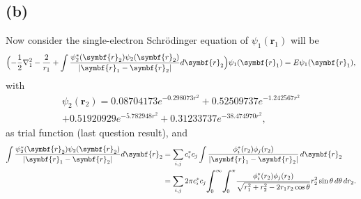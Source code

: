 

\subsection*{(b)}

Now consider the single-electron Schrödinger equation of $\psi_1(\symbf{r}_1)$ will be
%
\begin{equation}
    \Bigl(
    -\frac{1}{2}\nabla_1^2 - \frac{2}{r_1} + \int
    \frac{\psi_2^\ast(\symbf{r}_2)\psi_2(\symbf{r}_2)}{\lvert \symbf{r}_1 - \symbf{r}_2 \rvert} d\symbf{r}_2
    \Bigr)
    \psi_1(\symbf{r}_1) = E \psi_1 (\symbf{r}_1),
\end{equation}
%
with
%
\begin{multline}
    \psi_2(\symbf{r}_2) = 0.08704173 e^{-0.298073 r^2} + 0.52509737 e^{-1.242567 r^2}\\
    + 0.51920929 e^{-5.782948 r^2} + 0.31233737 e^{-38.474970 r^2},
\end{multline}
%
as trial function (last question result), and
%
\begin{equation}
    \begin{aligned}
        \int \frac{\psi_2^\ast(\symbf{r}_2)\psi_2(\symbf{r}_2)}{\lvert \symbf{r}_1 - \symbf{r}_2 \rvert} d\symbf{r}_2
         & = \sum_{i, j} c_i^\ast c_j \int
        \frac{\phi_i^\ast(r_2) \phi_j(r_2)}{\lvert \symbf{r}_1 - \symbf{r}_2 \rvert} \, d\symbf{r}_2    \\
         & = \sum_{i, j} 2\pi c_i^\ast c_j \scaleint{7ex}_{\bs 0}^{\infty} \scaleint{7ex}_{\bs 0}^{\pi}
        \frac{\phi_i^\ast(r_2) \phi_j(r_2)}{\sqrt{r_1^2 + r_2^2 - 2 r_1 r_2 \cos\theta}}
        r_2^2 \sin \theta\, d\theta\, dr_2.
    \end{aligned}
\end{equation}

